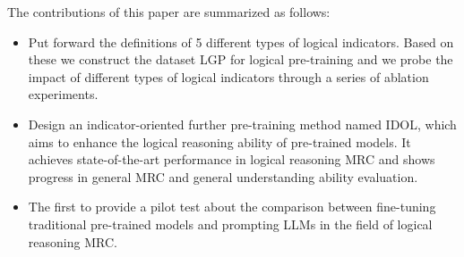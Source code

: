 \documentclass[11pt]{article}
\begin{document}
The contributions of this paper are summarized as follows:
\begin{itemize}
    \item Put forward the definitions of 5 different types of logical indicators. Based on these we construct the dataset LGP for logical pre-training and we probe the impact of different types of logical indicators through a series of ablation experiments.
    \item Design an indicator-oriented further pre-training method named IDOL, which aims to enhance the logical reasoning ability of pre-trained models. It achieves state-of-the-art performance in logical reasoning MRC and shows progress in general MRC and general understanding ability evaluation.
    \item The first to provide a pilot test about the comparison between fine-tuning traditional pre-trained models and prompting LLMs in the field of logical reasoning MRC.

\end{itemize}
\end{document}
